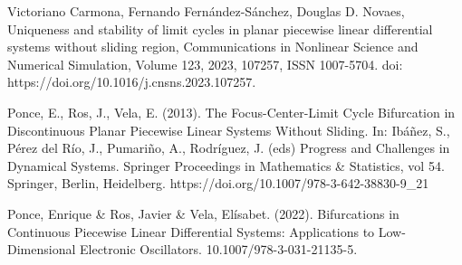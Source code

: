 \documentclass[12pt,a4paper]{report} %
\begin{document}
\begin{thebibliography}{99}
		 Victoriano Carmona, Fernando Fernández-Sánchez, Douglas D. Novaes,
		Uniqueness and stability of limit cycles in planar piecewise linear differential systems without sliding region,
		Communications in Nonlinear Science and Numerical Simulation,
		Volume 123, 2023, 107257, ISSN 1007-5704.
		doi: https://doi.org/10.1016/j.cnsns.2023.107257.
		
		 Ponce, E., Ros, J., Vela, E. (2013). The Focus-Center-Limit Cycle Bifurcation in Discontinuous Planar Piecewise Linear Systems Without Sliding. In: Ibáñez, S., Pérez del Río, J., Pumariño, A., Rodríguez, J. (eds) Progress and Challenges in Dynamical Systems. Springer Proceedings in Mathematics \& Statistics, vol 54. Springer, Berlin, Heidelberg. https://doi.org/10.1007/978-3-642-38830-9\_21
		
		 Ponce, Enrique \& Ros, Javier \& Vela, Elísabet. (2022). Bifurcations in Continuous Piecewise Linear Differential Systems: Applications to Low-Dimensional Electronic Oscillators. 10.1007/978-3-031-21135-5. 
		
	\end{thebibliography}
	
	\newpage
	
\end{document}
